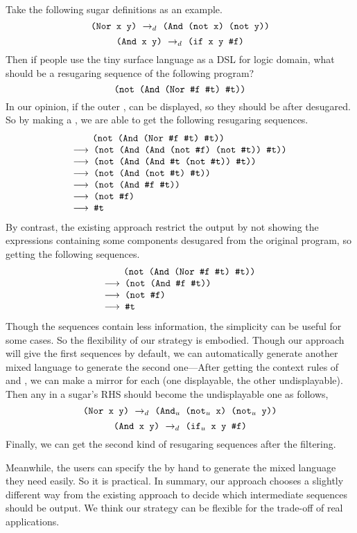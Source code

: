 Take the following sugar definitions as an example.
\[
\texttt{(Nor~x~y)} ~\rightarrow_d~ \texttt{(And~(not~x)~(not~y))}
\]
\[
\texttt{(And~x~y)} ~\rightarrow_d~ \texttt{(if~x~y~\#f)}
\]
Then if people use the tiny surface language as a DSL for logic domain, what should be a resugaring sequence of the following program?
\[
	\texttt{(not (And (Nor \#f~\#t) \#t))}
\]
In our opinion, if the outer ,  can be displayed, so they should be after desugared. So by making  a , we are able to get the following resugaring sequences.
\[
	\begin{array}{l}
		\qquad\Code{(not (And (Nor \false~\true) \true))}\\
		\OneStep{\Code{ (not (And (And (not \false) (not \true)) \true))}}\\
		\OneStep{\Code{ (not (And (And \true~(not \true)) \true))}}\\
		\OneStep{\Code{ (not (And (not \true) \true))}}\\
		\OneStep{\Code{ (not (And \false~\true))}}\\
		\OneStep{\Code{ (not \false)}}\\
		\OneStep{\Code{ \true}}\\
	\end{array}
\]
By contrast, the existing approach restrict the output by not showing the expressions containing some components desugared from the original program, so getting the following sequences.
\[
	\begin{array}{l}
		\qquad\Code{(not (And (Nor \false~\true) \true))}\\
		\OneStep{\Code{ (not (And \false~\true))}}\\
		\OneStep{\Code{ (not \false)}}\\
		\OneStep{\Code{ \true}}\\
	\end{array}
\]
Though the sequences contain less information, the simplicity can be useful for some cases. So the flexibility of our strategy is embodied. Though our approach will give the first sequences by default, we can automatically generate another mixed language to generate the second one---After getting the context rules of  and , we can make a mirror for each  (one displayable, the other undisplayable). Then any  in a sugar's RHS should become the undisplayable one as follows,
\[
\texttt{(Nor~x~y)} ~\rightarrow_d~ \texttt{($\mbox{\tt And}_u$~($\mbox{\tt not}_u$~x)~($\mbox{\tt not}_u$~y))}
\]
\[
\texttt{(And~x~y)} ~\rightarrow_d~ \texttt{($\mbox{\tt if}_u$~x~y~\#f)}
\]
Finally, we can get the second kind of resugaring sequences after the filtering.

Meanwhile, the users can specify the  by hand to generate the mixed language they need easily. So it is practical.
In summary, our approach chooses a slightly different way from the existing approach to decide which intermediate sequences should be output. We think our strategy can be flexible for the trade-off of real applications.
